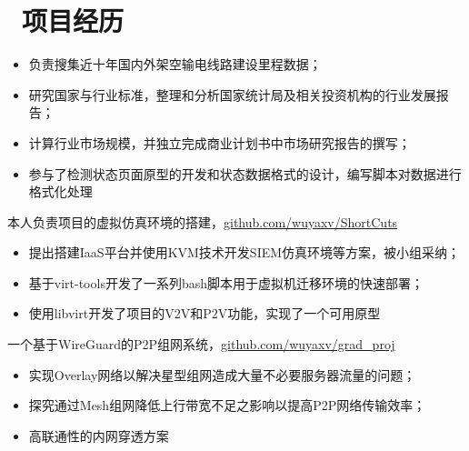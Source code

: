 \documentclass{resume}
\begin{document}
\section{\faUsers\ 项目经历}
\begin{itemize}
  \item 负责搜集近十年国内外架空输电线路建设里程数据；
  \item 研究国家与行业标准，整理和分析国家统计局及相关投资机构的行业发展报告；
  \item 计算行业市场规模，并独立完成商业计划书中市场研究报告的撰写；
  \item 参与了检测状态页面原型的开发和状态数据格式的设计，编写脚本对数据进行格式化处理
\end{itemize}
本人负责项目的虚拟仿真环境的搭建，\href{https://github.com/wuyaxv/ShortCuts}{github.com/wuyaxv/ShortCuts}
\begin{itemize}
  \item 提出搭建IaaS平台并使用KVM技术开发SIEM仿真环境等方案，被小组采纳；
  \item 基于virt-tools开发了一系列bash脚本用于虚拟机迁移环境的快速部署；
  \item 使用libvirt开发了项目的V2V和P2V功能，实现了一个可用原型
\end{itemize}

一个基于WireGuard的P2P组网系统，\href{https://github.com/wuyaxv/grad_proj}{github.com/wuyaxv/grad\_proj}
\begin{itemize}
  \item 实现Overlay网络以解决星型组网造成大量不必要服务器流量的问题；
  \item 探究通过Mesh组网降低上行带宽不足之影响以提高P2P网络传输效率；
  \item 高联通性的内网穿透方案
\end{itemize}

\end{document}
